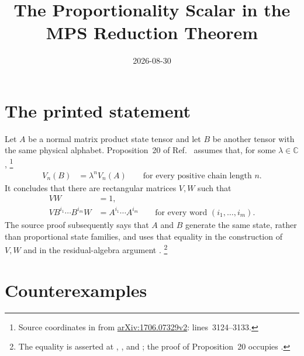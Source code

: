 \documentclass{article}
\title{The Proportionality Scalar in the MPS Reduction Theorem}
\author{}
\date{2026-08-30}
\begin{document}
\maketitle
{}

\section{The printed statement}

Let $A$ be a normal matrix product state tensor and let $B$ be another tensor
with the same physical alphabet.  Proposition~20 of
Ref.~\cite{Molnar2018SemiInjective} assumes that, for some
$\lambda\in\mathbb C$,
\footnote{Source coordinates in  from
    \href{https://arxiv.org/abs/1706.07329v2}{arXiv:1706.07329v2}:
    lines~3124--3133.}
\begin{align}
    V_n(B)
        &=\lambda^n V_n(A)
        \qquad\text{for every positive chain length }n.
    \label{eq:mgsc18_reduction_proportionality_printed_hypothesis}
\end{align}
It concludes that there are rectangular matrices $V,W$ such that
\begin{align}
    VW
        &=1,
    \label{eq:mgsc18_reduction_proportionality_printed_retraction}\\
    VB^{i_1}\cdots B^{i_m}W
        &=A^{i_1}\cdots A^{i_m}
        \qquad\text{for every word }(i_1,\ldots,i_m).
    \label{eq:mgsc18_reduction_proportionality_printed_word_relation}
\end{align}
The source proof subsequently says that $A$ and $B$ generate the same state,
rather than proportional state families, and uses that equality in the
construction of $V,W$ and in the residual-algebra argument
\cite{Molnar2018SemiInjective}.
\footnote{The equality is asserted at
    , , and
    ; the proof of Proposition~20 occupies
    .}

\section{Counterexamples}
\end{document}
